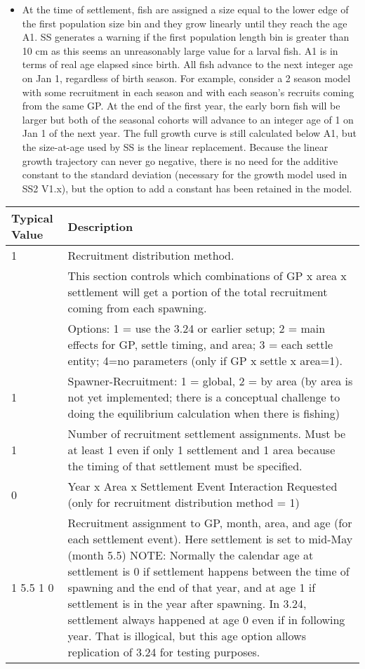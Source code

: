 \begin{description}
\begin{itemize}
		\item At the time of settlement, fish are assigned a size equal to the lower edge of the first population size bin and they grow linearly until they reach the age A1.  SS generates a warning if the first population length bin is greater than 10 cm as this seems an unreasonably large value for a larval fish.  A1 is in terms of real age elapsed since birth.  All fish advance to the next integer age on Jan 1, regardless of birth season.  For example, consider a 2 season model with some recruitment in each season and with each season’s recruits coming from the same GP.  At the end of the first year, the early born fish will be larger but both of the seasonal cohorts will advance to an integer age of 1 on Jan 1 of the next year.  The full growth curve is still calculated below A1, but the size-at-age used by SS is the linear replacement.  Because the linear growth trajectory can never go negative, there is no need for the additive constant to the standard deviation (necessary for the growth model used in SS2 V1.x), but the option to add a constant has been retained in the model.
	\end{itemize}
\end{description}
	
	
\begin{longtable}{p{0.5cm} p{2cm} p{12cm}}
	\multicolumn{2}{l}{Typical Value} & Description \\
	\hline		
	1 & & Recruitment distribution method.  \\
		& &  This section controls which combinations of GP x area x settlement will get a portion of the total recruitment coming from each spawning.  \\
		& &  Options: 1 = use the 3.24 or earlier setup; 2 = main effects for GP, settle timing, and area; 3 = each settle entity; 4=no parameters (only if GP x settle x area=1).\\
	\hline
	1 & & Spawner-Recruitment: 1 = global, 2 = by area (by area is not yet implemented; there is a conceptual challenge to doing the equilibrium calculation when there is fishing)\\
	\hline
	1 & & Number of recruitment settlement assignments.  Must be at least 1 even if only 1 settlement and 1 area because the timing of that settlement must be specified.\\
	\hline
	0 & & Year x Area x Settlement Event Interaction Requested (only for recruitment distribution method = 1)\\
	\hline
	\multicolumn{2}{l}{1 5.5 1 0}& Recruitment assignment to GP, month, area, and age (for each settlement event).  Here settlement is set to mid-May (month 5.5) NOTE:  Normally the calendar age at settlement is 0 if settlement happens between the time of spawning and the end of that year, and at age 1 if settlement is in the year after spawning.  In 3.24, settlement always happened at age 0 even if in following year.  That is illogical, but this age option allows replication of 3.24 for testing purposes.
	\\
	\hline
\end{longtable}


